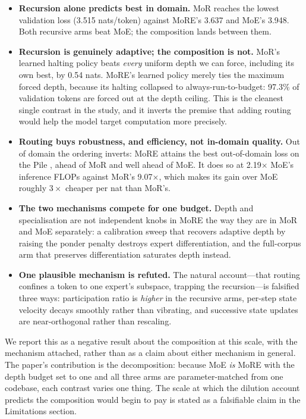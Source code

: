 \begin{itemize}[leftmargin=1.4em,itemsep=1.5pt,topsep=2pt]
\item \textbf{Recursion alone predicts best in domain.} MoR reaches the lowest
  validation loss (3.515 nats/token) against MoRE's 3.637 and MoE's 3.948. Both
  recursive arms beat MoE; the composition lands between them.

\item \textbf{Recursion is genuinely adaptive; the composition is not.} MoR's
  learned halting policy beats \emph{every} uniform depth we can force, including
  its own best, by 0.54 nats. MoRE's learned policy merely ties the maximum
  forced depth, because its halting collapsed to always-run-to-budget: 97.3\% of
  validation tokens are forced out at the depth ceiling. This is the cleanest
  single contrast in the study, and it inverts the premise that adding routing
  would help the model target computation more precisely.

\item \textbf{Routing buys robustness, and efficiency, not in-domain quality.}
  Out of domain the ordering inverts: MoRE attains the best out-of-domain loss on
  the Pile \citep{gao2020pile}, ahead of MoR and well ahead of MoE. It does so at
  2.19$\times$ MoE's inference FLOPs against MoR's 9.07$\times$, which makes its
  gain over MoE roughly $3\times$ cheaper per nat than MoR's.

\item \textbf{The two mechanisms compete for one budget.} Depth and
  specialisation are not independent knobs in MoRE the way they are in MoR and
  MoE separately: a calibration sweep that recovers adaptive depth by raising the
  ponder penalty destroys expert differentiation, and the full-corpus arm that
  preserves differentiation saturates depth instead.

\item \textbf{One plausible mechanism is refuted.} The natural account---that
  routing confines a token to one expert's subspace, trapping the recursion---is
  falsified three ways: participation ratio is \emph{higher} in the recursive
  arms, per-step state velocity decays smoothly rather than vibrating, and
  successive state updates are near-orthogonal rather than rescaling.
\end{itemize}

We report this as a negative result about the composition at this scale, with the
mechanism attached, rather than as a claim about either mechanism in general. The
paper's contribution is the decomposition: because MoE \emph{is} MoRE with the
depth budget set to one and all three arms are parameter-matched from one
codebase, each contrast varies one thing. The scale at which the dilution account
predicts the composition would begin to pay is stated as a falsifiable claim in
the Limitations section.

